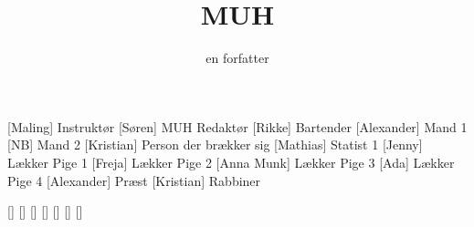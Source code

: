 \documentclass[a4paper,11pt]{article}
\title{MUH}
\author{en forfatter}
\begin{document}
\maketitle

\begin{roles}
[Maling] Instruktør
[Søren] MUH Redaktør
[Rikke] Bartender
[Alexander] Mand 1
[NB] Mand 2
[Kristian] Person der brækker sig
[Mathias] Statist 1
[Jenny] Lækker Pige 1
[Freja] Lækker Pige 2
[Anna Munk] Lækker Pige 3
[Ada] Lækker Pige 4
[Alexander] Præst
[Kristian] Rabbiner
\end{roles}

\begin{props}
[]
[]
[]
[]
[]
[]
[]
\end{props}
\end{document}
